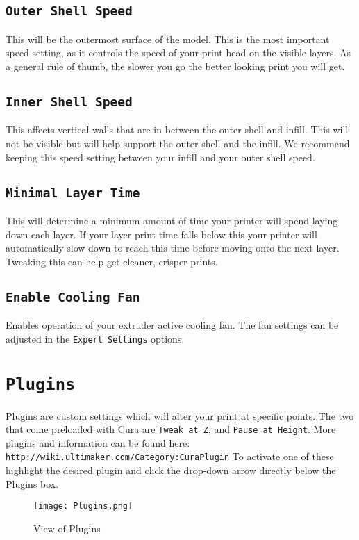 \subsection{\texttt{Outer Shell Speed}}
This will be the outermost surface of the model. This is the most important speed setting, as it controls the speed of your print head on the visible layers. As a general rule of thumb, the slower you go the better looking print you will get. 

\subsection{\texttt{Inner Shell Speed}}
This affects vertical walls that are in between the outer shell and infill. This will not be visible but will help support the outer shell and the infill. We recommend keeping this speed setting between your infill and your outer shell speed.

\subsection{\texttt{Minimal Layer Time}}
This will determine a minimum amount of time your printer will spend laying down each layer. If your layer print time falls below this your printer will automatically slow down to reach this time before moving onto the next layer. Tweaking this can help get cleaner, crisper prints.

\subsection{\texttt{Enable Cooling Fan}}
Enables operation of your extruder active cooling fan. The fan settings can be adjusted in the \texttt{Expert Settings} options.

\section{\texttt{Plugins}}
Plugins are custom settings which will alter your print at specific points. The two that come preloaded with Cura are \texttt{Tweak at Z}, and \texttt{Pause at Height}. More plugins and information can be found here: \texttt{http://wiki.ultimaker.com/Category:CuraPlugin} To activate one of these highlight the desired plugin and click the drop-down arrow directly below the Plugins box. 
\begin{figure}[H]
\centering
\texttt{[image: Plugins.png]}
\caption{View of Plugins}
\label{fig:Plugins}
\end{figure}

